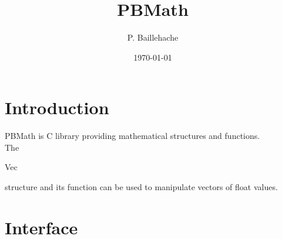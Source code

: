 \documentclass[12pt, a4paper]{article}
\begin{document}
\title{PBMath}
\author{P. Baillehache}
\date{\today}
\maketitle

\tableofcontents

\section*{Introduction}

PBMath is C library providing mathematical structures and functions.\\ 

The \begin{ttfamily}Vec\end{ttfamily} structure and its function can be used to manipulate vectors of float values.\\

\section{Interface}
\end{document}
